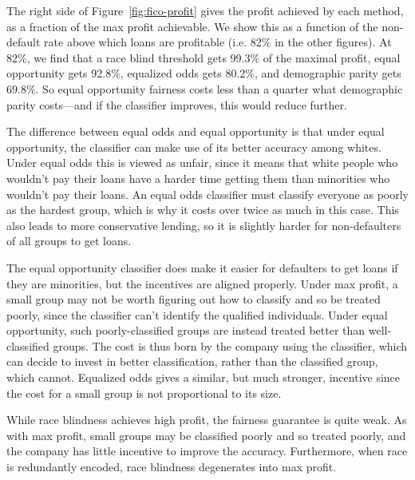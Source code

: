 The right side of Figure~\ref{fig:fico-profit} gives the profit
achieved by each method, as a fraction of the max profit achievable.
We show this as a function of the non-default rate above which loans
are profitable (i.e. 82\% in the other figures).  At 82\%, we find
that a race blind threshold gets 99.3\% of the maximal profit, equal
opportunity gets 92.8\%, equalized odds gets 80.2\%, and demographic
parity gets 69.8\%.  So equal opportunity fairness costs less than a
quarter what demographic parity costs---and if the classifier
improves, this would reduce further.

The difference between equal odds and equal opportunity is that under
equal opportunity, the classifier can make use of its better accuracy
among whites.  Under equal odds this is viewed as unfair, since it
means that white people who wouldn't pay their loans have a harder
time getting them than minorities who wouldn't pay their loans.  An
equal odds classifier must classify everyone as poorly as the hardest
group, which is why it costs over twice as much in this case.  This
also leads to more conservative lending, so it is slightly harder for
non-defaulters of all groups to get loans.

The equal opportunity classifier does make it easier for defaulters to
get loans if they are minorities, but the incentives are aligned properly.
Under max profit, a small group may not be worth figuring out how to
classify and so be treated poorly, since the classifier can't identify
the qualified individuals.  Under equal opportunity, such
poorly-classified groups are instead treated better than
well-classified groups.  The cost is thus born by the company using
the classifier, which can decide to invest in better classification,
rather than the classified group, which cannot.  Equalized odds gives
a similar, but much stronger, incentive since the cost for a small
group is not proportional to its size.

While race blindness achieves high profit, the fairness guarantee is
quite weak.  As with max profit, small groups may be classified poorly
and so treated poorly, and the company has little incentive to improve
the accuracy.  Furthermore, when race is redundantly encoded, race
blindness degenerates into max profit.

